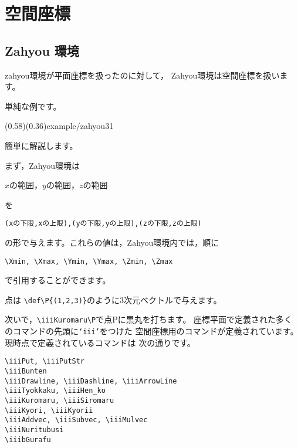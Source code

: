 \section{空間座標}
\subsection{\textsf{Zahyou} 環境}
\textsf{zahyou}環境が平面座標を扱ったのに対して，
\textsf{Zahyou}環境は空間座標を扱います。

単純な例です。

\showexample[空間座標](0.58)(0.36){example/zahyou31}

簡単に解説します。

まず，\textsf{Zahyou}環境は
\begin{jquote}
$x$の範囲，$y$の範囲，$z$の範囲
\end{jquote}
を\vspace{-\baselineskip}
\begin{jquote}
\begin{verbatim}
(xの下限,xの上限),(yの下限,yの上限),(zの下限,zの上限)
\end{verbatim}
\end{jquote}
の形で与えます。これらの値は，\textsf{Zahyou}環境内では，順に
\begin{jquote}
\begin{verbatim}
\Xmin, \Xmax, \Ymin, \Ymax, \Zmin, \Zmax
\end{verbatim}
\end{jquote}
で引用することができます。

点は \verb/\def\P{(1,2,3)}/のように3次元ベクトルで与えます。

次いで，\verb/\iiiKuromaru\P/で点Pに黒丸を打ちます。
座標平面で定義された多くのコマンドの先頭に\texttt{`iii'}をつけた
空間座標用のコマンドが定義されています。現時点で定義されているコマンドは
次の通りです。\vspace{-.5\baselineskip}
\begin{jquote}
\begin{verbatim}
\iiiPut, \iiiPutStr
\iiiBunten
\iiiDrawline, \iiiDashline, \iiiArrowLine
\iiiTyokkaku, \iiiHen_ko
\iiiKuromaru, \iiiSiromaru
\iiiKyori, \iiiKyorii
\iiiAddvec, \iiiSubvec, \iiiMulvec
\iiiNuritubusi
\iiibGurafu
\end{verbatim}
\end{jquote}

